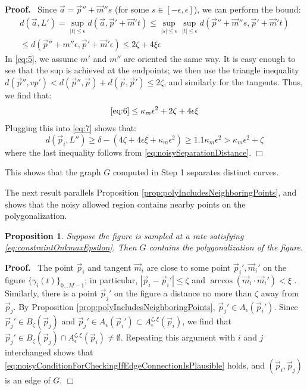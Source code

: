 \documentclass{article}
\newtheorem{proposition}[cntr]{Proposition}
\newenvironment{proof}{
  \noindent\textbf{Proof.}\ }{\hspace*{\fill}
  \begin{math}\Box\end{math}\medskip}
\numberwithin{cntr}{section}
\numberwithin{equation}{section}
\newcommand{\abs}[1]{\left| #1 \right|}%
\newcommand{\vp}[0]{{\vec{p}}}
\newcommand{\vm}[0]{{\vec{m}}}
\newcommand{\va}[0]{{\vec{a}}}
\newcommand{\Oto}[1]{{0 \ldots #1-1}}
\newcommand{\curveSet}{{ \{ \gamma_i(t) \}_{\Oto{M}}}}
\newcommand{\ball}[2]{ { B_{#1}(#2) } }
\newcommand{\allowed}[2]{ { A_{#1}(#2) } }
\newcommand{\curvemax}{{\kappa_{m}}}
\newcommand{\curvesep}{{\delta}}
\newcommand{\pointNoise}{{\zeta}}
\newcommand{\tanNoise}{{\xi}}
\newcommand{\nallowed}[2]{ { A^{\pointNoise, \tanNoise}_{#1}(#2) } }
\begin{document}
\begin{proof}
  Since $\va=\vp'' + \vm'' s$ (for some $s \in [-\epsilon,\epsilon]$), we can perform the bound:
  \begin{multline}
    \label{eq:5}
    d(\va,L') = \sup_{\abs{t} \leq \epsilon} d(\va, \vp' + \vm' t) \leq \sup_{\abs{s} \leq \epsilon} \sup_{ \abs{t} \leq \epsilon} d(\vp'' + \vm'' s, \vp' + \vm' t) \\
    \leq d(\vp'' + m'' \epsilon, \vp' + \vm' \epsilon) \leq 2 \pointNoise + 4 \tanNoise \epsilon
  \end{multline}
  In \eqref{eq:5}, we assume $m'$ and $m''$ are oriented the same way. It is easy enough to see that the sup is achieved at the endpoints; we then use the triangle inequality $d(\vp'', vp') < d(\vp'', \vp) + d(\vp, \vp') \leq 2 \pointNoise$, and similarly for the tangents.
  Thus, we find that:
  \begin{equation}
    \eqref{eq:6} \leq \curvemax \epsilon^{2} + 2 \pointNoise + 4 \epsilon \tanNoise
  \end{equation}
  Plugging this into \eqref{eq:7} shows that:
  \begin{equation}
    d(\vp_{i},L'') \geq \curvesep - (4 \pointNoise + 4 \epsilon \tanNoise + \curvemax \epsilon^{2}) \geq 1.1 \curvemax \epsilon^{2} > \curvemax \epsilon^{2} + \pointNoise
  \end{equation}
  where the last inequality follows from \eqref{eq:noisySeparationDistance}.
\end{proof}

This shows that the graph $G$ computed in Step 1 separates distinct curves.

The next result parallels Proposition \ref{prop:polyIncludesNeighboringPoints}, and shows that the noisy allowed region contains nearby points on the polygonalization.

\begin{proposition}
  Suppose the figure is sampled at a rate satisfying \eqref{eq:constraintOnkmaxEpsilon}. Then $G$ contains the polygonalization of the figure.
\end{proposition}

\begin{proof}
  The point $\vp_{i}$ and tangent $\vm_{i}$ are close to some point $\vp_{i}', \vm_{i}'$ on the figure $\curveSet$; in particular, $\abs{\vp_{i} - \vp_{i}'} \leq \pointNoise$ and $\arccos(\vm_{i} \cdot \vm_{i}') < \tanNoise$ . Similarly, there is a point $\vp_{j}'$ on the figure a distance no more than $\pointNoise$ away from $\vp_{j}$. By Proposition \ref{prop:polyIncludesNeighboringPoints}, $\vp_{j}' \in \allowed{\epsilon}{\vp_{i}'}$. Since $\vp_{j}' \in \ball{\pointNoise}{\vp_{j}}$ and $\vp_{j}' \in \allowed{\epsilon}{\vp_{i}'} \subset \nallowed{\epsilon}{\vp_{i}}$, we find that $\vp_{j}' \in \ball{\pointNoise}{\vp_{j}} \cap \nallowed{\epsilon}{\vp_{i}} \neq \emptyset$. Repeating this argument with $i$ and $j$ interchanged shows that \eqref{eq:noisyConditionForCheckingIfEdgeConnectionIsPlausible} holds, and $(\vp_{i}, \vp_{j})$ is an edge of $G$.
\end{proof}
\end{document}
